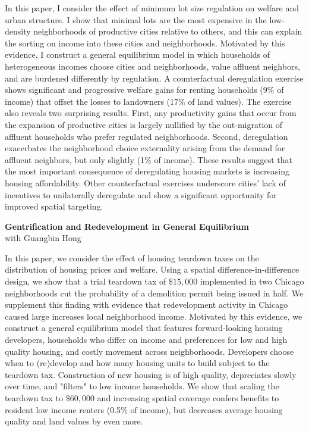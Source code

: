 \documentclass[11pt]{amsart}
\begin{document}
In this paper, I consider the effect of minimum lot size regulation on welfare and urban structure. I show that minimal lots are the most expensive in the low-density neighborhoods of productive cities relative to others, and this can explain the sorting on income into these cities and neighborhoods. Motivated by this evidence, I construct a general equilibrium model in which households of heterogeneous incomes choose cities and neighborhoods, value affluent neighbors, and are burdened differently by regulation. A counterfactual deregulation exercise shows significant and progressive welfare gains for renting households (9\% of income) that offset the losses to landowners (17\% of land values). The exercise also reveals two surprising results. First, any productivity gains that occur from the expansion of productive cities is largely nullified by the out-migration of affluent households who prefer regulated neighborhoods. Second, deregulation exacerbates the neighborhood choice externality arising from the demand for affluent neighbors, but only slightly (1\% of income). These results suggest that the most important consequence of deregulating housing markets is increasing housing affordability. Other counterfactual exercises underscore cities’ lack of incentives to unilaterally deregulate and show a significant opportunity for improved spatial
targeting.  \\


\bigskip
\begin{center}
\LARGE
\textbf{Gentrification and Redevelopment in General Equilibrium}\\
\large
  with Guangbin Hong
\normalsize
\end{center}

In this paper, we consider the effect of housing teardown taxes on the distribution of housing prices and welfare. Using a spatial difference-in-difference design, we show that a trial teardown tax of $\$15,000$ implemented in two Chicago neighborhoods cut the probability of a demolition permit being issued in half. We supplement this finding with evidence that redevelopment activity in Chicago caused large increases local neighborhood income. Motivated by this evidence, we construct a general equilibrium model that features forward-looking housing developers, households who differ on income and preferences for low and high quality housing, and costly movement across neighborhoods. Developers choose when to (re)develop and how many housing units to build subject to the teardown tax. Construction of new housing is of high quality, depreciates slowly over time, and "filters" to low income households. We show that scaling the teardown tax to $\$60,000$ and increasing spatial coverage confers benefits to resident low income renters (0.5\% of income), but decreases average housing quality and land values by even more. 
\end{document}
